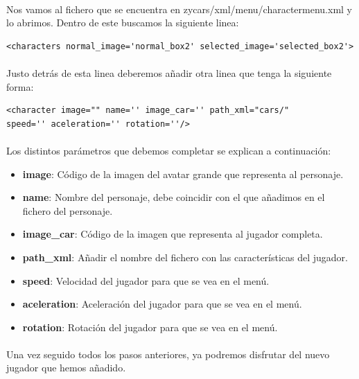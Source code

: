 \paragraph{}
Nos vamos al fichero que se encuentra en zycars/xml/menu/charactermenu.xml y lo abrimos. Dentro de este buscamos la siguiente
linea:

\begin{lstlisting}[style=XML]
<characters normal_image='normal_box2' selected_image='selected_box2'>
\end{lstlisting}

\paragraph{}
Justo detrás de esta linea deberemos añadir otra linea que tenga la siguiente forma:

\begin{lstlisting}[style=XML]
<character image="" name='' image_car='' path_xml="cars/" 
speed='' aceleration='' rotation=''/>
\end{lstlisting}

\paragraph{}
Los distintos parámetros que debemos completar se explican a continuación:

\begin{itemize}
    \item \textbf{image}: Código de la imagen del avatar grande que representa al personaje.
    \item \textbf{name}: Nombre del personaje, debe coincidir con el que añadimos en el fichero del personaje.
    \item \textbf{image\_car}: Código de la imagen que representa al jugador completa.
    \item \textbf{path\_xml}: Añadir el nombre del fichero con las características del jugador.
    \item \textbf{speed}: Velocidad del jugador para que se vea en el menú.
    \item \textbf{aceleration}: Aceleración del jugador para que se vea en el menú.
    \item \textbf{rotation}: Rotación del jugador para que se vea en el menú.
\end{itemize}

\paragraph{}
Una vez seguido todos los pasos anteriores, ya podremos disfrutar del nuevo jugador que hemos añadido.
